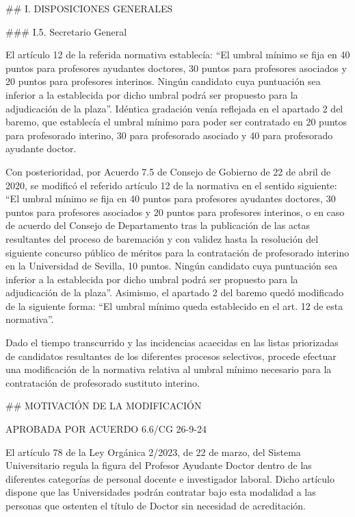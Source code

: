 \documentclass{article}
\begin{document}
\begin{itemize}
\begin{itemize}
\begin{scriptsize}
                  \#\# I. DISPOSICIONES GENERALES

                  \#\#\# I.5. Secretario General

                  El artículo 12 de la referida normativa establecía: “El umbral mínimo se fija en 40 puntos para profesores ayudantes doctores, 30 puntos para profesores asociados y 20 puntos para profesores interinos. Ningún candidato cuya puntuación sea inferior a la establecida por dicho umbral podrá ser propuesto para la adjudicación de la plaza”. Idéntica gradación venía reflejada en el apartado 2 del baremo, que establecía el umbral mínimo para poder ser contratado en 20 puntos para profesorado interino, 30 para profesorado asociado y 40 para profesorado ayudante doctor.

                  Con posterioridad, por Acuerdo 7.5 de Consejo de Gobierno de 22 de abril de 2020, se modificó el referido artículo 12 de la normativa en el sentido siguiente: “El umbral mínimo se fija en 40 puntos para profesores ayudantes doctores, 30 puntos para profesores asociados y 20 puntos para profesores interinos, o en caso de acuerdo del Consejo de Departamento tras la publicación de las actas resultantes del proceso de baremación y con validez hasta la resolución del siguiente concurso público de méritos para la contratación de profesorado interino en la Universidad de Sevilla, 10 puntos. Ningún candidato cuya puntuación sea inferior a la establecida por dicho umbral podrá ser propuesto para la adjudicación de la plaza”. Asimismo, el apartado 2 del baremo quedó modificado de la siguiente forma: “El umbral mínimo queda establecido en el art. 12 de esta normativa”.

                  Dado el tiempo transcurrido y las incidencias acaecidas en las listas priorizadas de candidatos resultantes de los diferentes procesos selectivos, procede efectuar una modificación de la normativa relativa al umbral mínimo necesario para la contratación de profesorado sustituto interino.

                  \#\# MOTIVACIÓN DE LA MODIFICACIÓN

                  APROBADA POR ACUERDO 6.6/CG 26-9-24

                  El artículo 78 de la Ley Orgánica 2/2023, de 22 de marzo, del Sistema Universitario regula la figura del Profesor Ayudante Doctor dentro de las diferentes categorías de personal docente e investigador laboral. Dicho artículo dispone que las Universidades podrán contratar bajo esta modalidad a las personas que ostenten el título de Doctor sin necesidad de acreditación.


\end{scriptsize}
\end{itemize}
\end{itemize}
\end{document}
